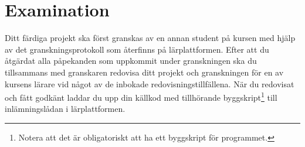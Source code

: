 \section{Examination}
\label{sec:Examination}
\noindent
Ditt färdiga projekt ska först granskas av en annan student på kursen med hjälp 
av det granskningsprotokoll som återfinns på lärplattformen.
Efter att du åtgärdat alla påpekanden som uppkommit under granskningen ska du 
tillsammans med granskaren redovisa ditt projekt och granskningen för en av 
kursens lärare vid något av de inbokade redovisningstillfällena.
När du redovisat och fått godkänt laddar du upp din källkod med tillhörande 
byggskript\footnote{%
	Notera att det är obligatoriskt att ha ett byggskript för programmet.
} till inlämningslådan i lärplattformen.
